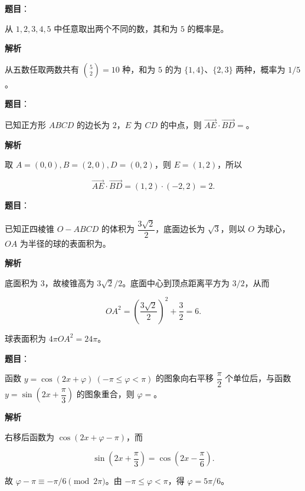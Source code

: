 \begin{answer}

\textbf{题目}：

从 $1,2,3,4,5$ 中任意取出两个不同的数，其和为 $5$ 的概率是\gkblank{}。

\textbf{解析}

从五数任取两数共有 $\binom52=10$ 种，和为 $5$ 的为 $\{1,4\}$、$\{2,3\}$ 两种，概率为 $1/5$。


\end{answer}
\begin{answer}

\textbf{题目}：

已知正方形 $ABCD$ 的边长为 $2$，$E$ 为 $CD$ 的中点，则 $\overrightarrow{AE}\cdot\overrightarrow{BD}=$\gkblank{}。

\textbf{解析}

取 $A=(0,0),B=(2,0),D=(0,2)$，则 $E=(1,2)$，所以

\nopagebreak[4]
\[\overrightarrow{AE}\cdot\overrightarrow{BD}=(1,2)\cdot(-2,2)=2.\]


\end{answer}
\begin{answer}

\textbf{题目}：

已知正四棱锥 $O-ABCD$ 的体积为 $\dfrac{3\sqrt2}{2}$，底面边长为 $\sqrt3$，则以 $O$ 为球心，$OA$ 为半径的球的表面积为\gkblank{}。

\textbf{解析}

底面积为 $3$，故棱锥高为 $3\sqrt2/2$。底面中心到顶点距离平方为 $3/2$，从而

\nopagebreak[4]
\[OA^2=\left(\frac{3\sqrt2}{2}\right)^2+\frac32=6.\]

球表面积为 $4\pi OA^2=24\pi$。


\end{answer}
\begin{answer}

\textbf{题目}：

函数 $y=\cos(2x+\varphi)\ (-\pi\leqslant\varphi<\pi)$ 的图象向右平移 $\dfrac\pi2$ 个单位后，与函数 $y=\sin\left(2x+\dfrac\pi3\right)$ 的图象重合，则 $\varphi=$\gkblank{}。

\textbf{解析}

右移后函数为 $\cos(2x+\varphi-\pi)$，而

\nopagebreak[4]
\[\sin\left(2x+\frac\pi3\right)=\cos\left(2x-\frac\pi6\right).\]

故 $\varphi-\pi\equiv-\pi/6\pmod {2\pi}$。由 $-\pi\leqslant\varphi<\pi$，得 $\varphi=5\pi/6$。


\end{answer}

